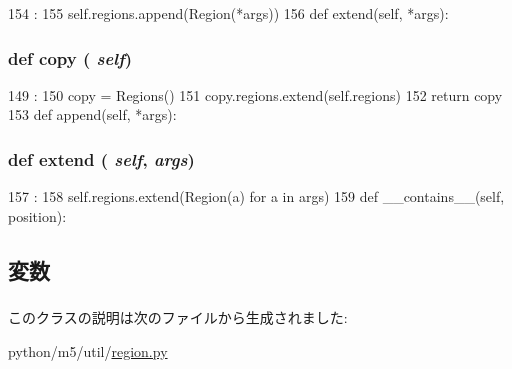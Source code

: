 \begin{DoxyCode}
154                            :
155         self.regions.append(Region(*args))
156 
    def extend(self, *args):
\end{DoxyCode}
\hypertarget{classm5_1_1util_1_1region_1_1Regions_a2fa43c22b5f7af93ba8b4a56871f006a}{
\subsubsection[{copy}]{\setlength{\rightskip}{0pt plus 5cm}def copy ( {\em self})}}
\label{classm5_1_1util_1_1region_1_1Regions_a2fa43c22b5f7af93ba8b4a56871f006a}



\begin{DoxyCode}
149                   :
150         copy = Regions()
151         copy.regions.extend(self.regions)
152         return copy
153 
    def append(self, *args):
\end{DoxyCode}
\hypertarget{classm5_1_1util_1_1region_1_1Regions_a2905cc8a60ce1ff6b37b5f8810f4ae5a}{
\subsubsection[{extend}]{\setlength{\rightskip}{0pt plus 5cm}def extend ( {\em self}, \/   {\em args})}}
\label{classm5_1_1util_1_1region_1_1Regions_a2905cc8a60ce1ff6b37b5f8810f4ae5a}



\begin{DoxyCode}
157                            :
158         self.regions.extend(Region(a) for a in args)
159 
    def __contains__(self, position):
\end{DoxyCode}


\subsection{変数}
\hypertarget{classm5_1_1util_1_1region_1_1Regions_a4c4786354df7358bf12c3c65069dd8b7}{
\subsubsection[{regions}]{}}
\label{classm5_1_1util_1_1region_1_1Regions_a4c4786354df7358bf12c3c65069dd8b7}


このクラスの説明は次のファイルから生成されました:\begin{DoxyCompactItemize}
\item 
python/m5/util/\hyperlink{region_8py}{region.py}\end{DoxyCompactItemize}
